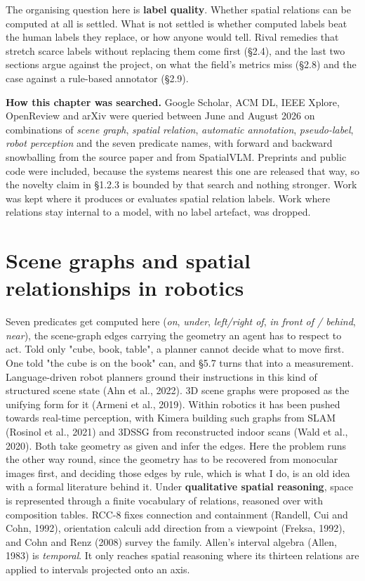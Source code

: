 
The organising question here is \textbf{label quality}. Whether spatial relations can be computed at all is settled. What is not settled is whether computed labels beat the human labels they replace, or how anyone would tell. Rival remedies that stretch scarce labels without replacing them come first (\S{}2.4), and the last two sections argue against the project, on what the field's metrics miss (\S{}2.8) and the case against a rule-based annotator (\S{}2.9).

\textbf{How this chapter was searched.} Google Scholar, ACM DL, IEEE Xplore, OpenReview and arXiv were queried between June and August 2026 on combinations of \textit{scene graph}, \textit{spatial relation}, \textit{automatic annotation}, \textit{pseudo-label}, \textit{robot perception} and the seven predicate names, with forward and backward snowballing from the source paper and from SpatialVLM. Preprints and public code were included, because the systems nearest this one are released that way, so the novelty claim in \S{}1.2.3 is bounded by that search and nothing stronger. Work was kept where it produces or evaluates spatial relation labels. Work where relations stay internal to a model, with no label artefact, was dropped.

\section{Scene graphs and spatial relationships in robotics}

Seven predicates get computed here (\textit{on}, \textit{under}, \textit{left/right of}, \textit{in front of / behind}, \textit{near}), the scene-graph edges carrying the geometry an agent has to respect to act. Told only "cube, book, table", a planner cannot decide what to move first. One told "the cube is on the book" can, and \S{}5.7 turns that into a measurement. Language-driven robot planners ground their instructions in this kind of structured scene state (Ahn et al., 2022). 3D scene graphs were proposed as the unifying form for it (Armeni et al., 2019). Within robotics it has been pushed towards real-time perception, with Kimera building such graphs from SLAM (Rosinol et al., 2021) and 3DSSG from reconstructed indoor scans (Wald et al., 2020). Both take geometry as given and infer the edges. Here the problem runs the other way round, since the geometry has to be recovered from monocular images first, and deciding those edges by rule, which is what I do, is an old idea with a formal literature behind it. Under \textbf{qualitative spatial reasoning}, space is represented through a finite vocabulary of relations, reasoned over with composition tables. RCC-8 fixes connection and containment (Randell, Cui and Cohn, 1992), orientation calculi add direction from a viewpoint (Freksa, 1992), and Cohn and Renz (2008) survey the family. Allen's interval algebra (Allen, 1983) is \textit{temporal}. It only reaches spatial reasoning where its thirteen relations are applied to intervals projected onto an axis.

